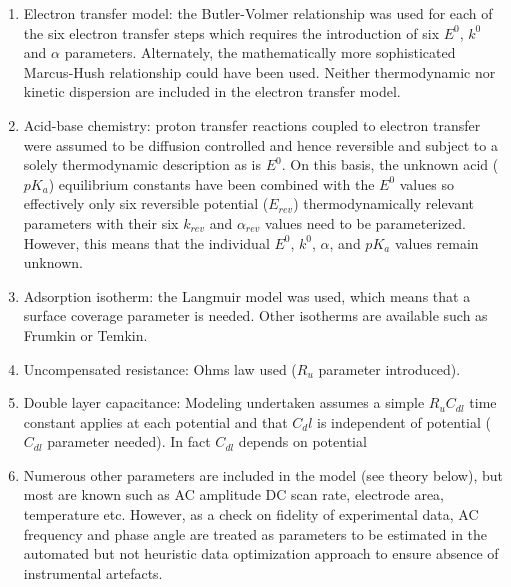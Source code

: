 \documentclass[a4paper, 12pt]{article}
\begin{document}
\begin{enumerate}
\item Electron transfer model: the Butler-Volmer relationship was used for each 
    of the six electron transfer steps which requires the introduction of six 
        $E^0$, $k^0$ and $\alpha$ parameters.  Alternately, the mathematically 
        more sophisticated Marcus-Hush relationship could have been used.  
        Neither thermodynamic nor kinetic dispersion are included in the 
        electron transfer model.

\item Acid-base chemistry: proton transfer reactions coupled to electron 
    transfer were assumed to be diffusion controlled and hence reversible and 
        subject to a solely thermodynamic description as is $E^0$. On this 
        basis, the unknown acid ($pK_a$) equilibrium constants have been 
        combined with the $E^0$ values so effectively only six reversible 
        potential ($E_{rev}$) thermodynamically relevant parameters with their 
        six $k_{rev}$ and $\alpha_{rev}$ values need to be parameterized.  
        However, this means that the individual $E^0$, $k^0$, $\alpha$, and 
        $pK_a$ values remain unknown.  

\item Adsorption isotherm: the Langmuir model was used, which means that a 
    surface coverage parameter is needed. Other isotherms are available such as 
        Frumkin or Temkin.

\item Uncompensated resistance: Ohms law used ($R_u$ parameter introduced).

\item Double layer capacitance: Modeling undertaken assumes a simple $R_u$$C_{dl}$ time 
    constant   applies at each potential and that $C_dl$ is independent of 
        potential ($C_{dl}$ parameter needed). In fact $C_{dl}$ depends on potential

\item Numerous other parameters are included in the model (see theory below), 
    but most are known such as AC amplitude DC scan rate, electrode area, 
        temperature etc. However, as a check on fidelity of experimental data, 
        AC frequency and phase angle are treated as parameters to be estimated 
        in the automated but not heuristic data optimization approach to ensure 
        absence of instrumental artefacts.  

\end{enumerate}
\end{document}
